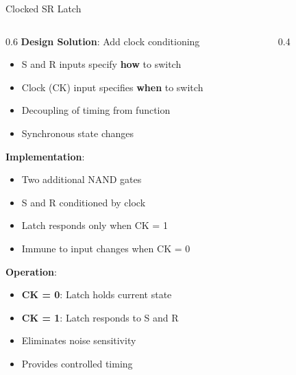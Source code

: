 \documentclass[aspectratio=169,11pt]{beamer}
\newcommand{\concept}[1]{\textbf{\color{accentcolor}#1}}
\begin{document}
\begin{frame}{Clocked SR Latch}
\begin{columns}
\begin{column}{0.6\textwidth}
\concept{Design Solution}: Add clock conditioning
\begin{itemize}
\item S and R inputs specify \textbf{how} to switch
\item Clock (CK) input specifies \textbf{when} to switch
\item Decoupling of timing from function
\item Synchronous state changes
\end{itemize}
\vspace{0.3cm}
\concept{Implementation}:
\begin{itemize}
\item Two additional NAND gates
\item S and R conditioned by clock
\item Latch responds only when CK = 1
\item Immune to input changes when CK = 0
\end{itemize}
\vspace{0.3cm}
\concept{Operation}:
\begin{itemize}
\item \textbf{CK = 0}: Latch holds current state
\item \textbf{CK = 1}: Latch responds to S and R
\item Eliminates noise sensitivity
\item Provides controlled timing
\end{itemize}
\end{column}
\begin{column}{0.4\textwidth}
\begin{center}

\end{center}
\end{column}
\end{columns}
\end{frame}
\end{document}
